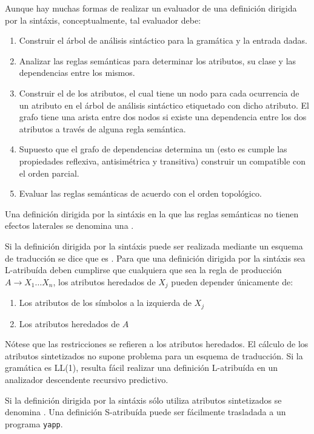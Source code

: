 Aunque hay muchas formas de realizar un evaluador de una definición
dirigida por la sintáxis, conceptualmente, tal evaluador debe:

\begin{enumerate}
\item
Construir el árbol de análisis sintáctico para la gramática
y la entrada dadas.
\item
Analizar las reglas semánticas para determinar los atributos,
su clase y las dependencias entre los mismos.
\item
Construir el  de los atributos,
el cual tiene
un nodo para cada ocurrencia de un atributo en el árbol de análisis
sintáctico etiquetado con dicho atributo. El grafo tiene una arista entre dos
nodos si existe una dependencia entre los dos atributos a través de alguna
regla semántica. 
\item
Supuesto que el grafo de dependencias determina un 
(esto es cumple las propiedades reflexiva, antisimétrica y transitiva) 
construir un  compatible con el orden parcial.
\item
Evaluar las reglas semánticas de acuerdo con el orden topológico.
\end{enumerate}

Una definición dirigida por la sintáxis en la que las reglas semánticas
no tienen efectos laterales se denomina una .

Si la definición dirigida por la sintáxis puede ser realizada 
mediante un esquema de traducción se dice que es .
Para que una definición dirigida por la sintáxis sea L-atribuída
deben cumplirse que cualquiera que sea la regla de producción
$A \rightarrow X_1 \ldots X_n$, los atributos heredados de
$X_j$ pueden depender únicamente de:
\begin{enumerate}
\item
Los atributos de los símbolos a la izquierda de $X_j$
\item
Los atributos heredados de $A$
\end{enumerate}

Nótese que las restricciones se refieren a los atributos heredados.
El cálculo de los atributos sintetizados no supone 
problema para un esquema de traducción. Si la gramática
es LL(1), resulta fácil realizar una definición 
L-atribuída en un analizador descendente recursivo predictivo.

Si la definición dirigida por la sintáxis sólo utiliza 
atributos sintetizados se denomina . Una
definición S-atribuída puede ser fácilmente trasladada a un programa
\verb|yapp|.

